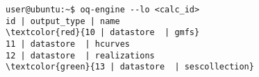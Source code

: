\begin{Verbatim}[frame=single, commandchars=\\\{\}, fontsize=\small]
user@ubuntu:~$ oq-engine --lo <calc_id>
id | output_type | name
\textcolor{red}{10 | datastore  | gmfs}
11 | datastore  | hcurves
12 | datastore  | realizations
\textcolor{green}{13 | datastore  | sescollection}
\end{Verbatim}
